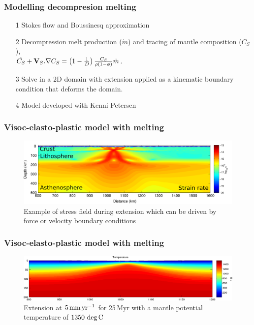 \documentclass[aspectratio=169]{beamer}
\begin{document}
\begin{frame}
    \frametitle{Modelling decompresion melting}
    \begin{itemize}
        \item[1]{Stokes flow and Boussinesq approximation}
        \item[2]{Decompression melt production ($\dot{m}$) and tracing of mantle composition ($C_{S}$),\\
                 $\dot{C_{S}} + {\bf V}_{S}.\nabla C_{S} = \left(1 - \frac{1}{D}\right)\frac{C_{S}}{\rho(1-\phi)}\dot{m}$}.
        \item[3]{Solve in a 2D domain with extension applied as a kinematic boundary condition that deforms the domain.}
        \item[4]{Model developed with Kenni Petersen}
    \end{itemize}
\end{frame}

\begin{frame}
    \frametitle{Visoc-elasto-plastic model with melting}
    \begin{figure}
        \includegraphics[width=0.8\paperwidth]{./figures/mess-example.png}
        \caption{Example of stress field during extension which can be driven by force or velocity boundary conditions}
    \end{figure}
\end{frame}

\begin{frame}
    \frametitle{Visoc-elasto-plastic model with melting}
    \begin{figure}
        \includegraphics[width=0.8\paperwidth]{./figures/MESS1.png}
        \caption{Extension at $5\rm\,mm\,yr^{-1}$ for 25\,Myr with a mantle potential temperature of $1350\,\deg\rm C$}
    \end{figure}
\end{frame}
\end{document}
